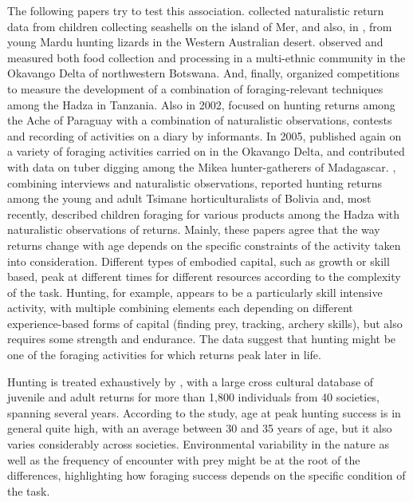 The following papers try to test this association. 
\cite{bird_children_2002} collected naturalistic return data from children collecting seashells on the island of Mer, and also, in \cite{bird_constraints_2002}, from young Mardu hunting lizards in the Western Australian desert. \cite{bock_learning_2002} observed and measured both food collection and processing in a multi-ethnic community in the Okavango Delta of northwestern Botswana. And, finally, \cite{blurton_jones_selection_2002} organized competitions to measure the development of a combination of foraging-relevant techniques among the Hadza in Tanzania. 
Also in 2002, \cite{walker_age-dependency_2002} focused on hunting returns among the Ache of Paraguay with a combination of naturalistic observations, contests and recording of activities on a diary by informants. 
In 2005, \cite{bock_what_2005} published again on a variety of foraging activities carried on in the Okavango Delta, and \cite{tucker_growing_2005} contributed with data on tuber digging among the Mikea hunter-gatherers of Madagascar. 
\cite{gurven_how_2006}, combining interviews and naturalistic observations, reported hunting returns among the young and adult Tsimane horticulturalists of Bolivia and, most recently, \cite{crittenden_juvenile_2013} described children foraging for various products among the Hadza with naturalistic observations of returns.
Mainly, these papers agree that the way returns change with age depends on the specific constraints of the activity taken into consideration. Different types of embodied capital, such as growth or skill based, peak at different times for different resources according to the complexity of the task. Hunting, for example, appears to be a particularly skill intensive activity, with multiple combining elements each depending on different experience-based forms of capital (finding prey, tracking, archery skills), but also requires some strength and endurance. The data suggest that hunting might be one of the foraging activities for which returns peak later in life. 

Hunting is treated exhaustively by \cite{koster_life_2020}, with a large cross cultural database of juvenile and adult returns for more than 1,800 individuals from 40 societies, spanning several years. According to the study, age at peak hunting success is in general quite high, with an average between 30 and 35 years of age, but it also varies considerably across societies. Environmental variability in the nature as well as the frequency of encounter with prey might be at the root of the differences, highlighting how foraging success depends on the specific condition of the task. 

